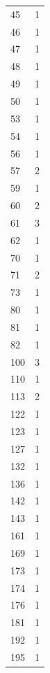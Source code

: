 \documentclass[12pt]{article}
\begin{document}
\begin{itemize}
\begin{center}
\begin{longtable}{|l|l|}
        45       & 1      \\
        46       & 1      \\
        47       & 1      \\
        48       & 1      \\
        49       & 1      \\
        50       & 1      \\
        53       & 1      \\
        54       & 1      \\
        56       & 1      \\
        57       & 2      \\
        59       & 1      \\
        60       & 2      \\
        61       & 3      \\
        62       & 1      \\
        70       & 1      \\
        71       & 2      \\
        73       & 1      \\
        80       & 1      \\
        81       & 1      \\
        82       & 1      \\
        100      & 3      \\
        110      & 1      \\
        113      & 2      \\
        122      & 1      \\
        123      & 1      \\
        127      & 1      \\
        132      & 1      \\
        136      & 1      \\
        142      & 1      \\
        143      & 1      \\
        161      & 1      \\
        169      & 1      \\
        173      & 1      \\
        174      & 1      \\
        176      & 1      \\
        181      & 1      \\
        192      & 1      \\
        195      & 1      \\

\end{longtable}
\end{center}
\end{itemize}
\end{document}
